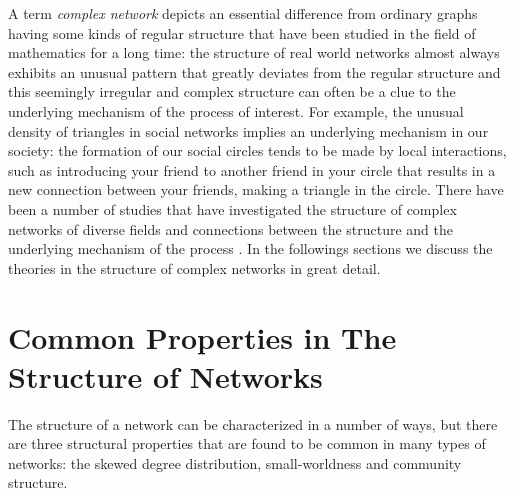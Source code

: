 	A term \textit{complex network} depicts an essential difference from ordinary graphs having some kinds of regular structure that have been studied in the field of mathematics for a long time: the structure of real world networks almost always exhibits an unusual pattern that greatly deviates from the regular structure and this seemingly irregular and complex structure can often be a clue to the underlying mechanism of the process of interest.  For example, the unusual density of triangles in social networks implies an underlying mechanism in our society: the formation of our social circles tends to be made by local interactions, such as introducing your friend to another friend in your circle that results in a new connection between your friends, making a triangle in the circle. There have been a number of studies that have investigated the structure of complex networks of diverse fields and connections between the structure and the underlying mechanism of the process \cite{Strogatz2001, Newman03thestructure, StatisticalMechanics, boccaletti06}. In the followings sections we discuss the theories in the structure of complex networks in great detail.
	
	\section{Common Properties in The Structure of Networks}
	The structure of a network can be characterized in a number of ways, but there are three structural properties that are found to be common in many types of networks: the skewed degree distribution, small-worldness and community structure.
	
